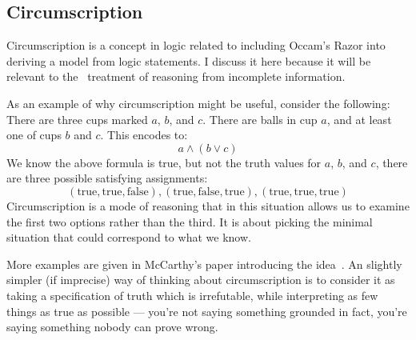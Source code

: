 \subsection{Circumscription}
\label{sec:circumscription}
Circumscription is a concept in logic related to including Occam's Razor into deriving a model from logic statements.
I discuss it here because it will be relevant to the \sysname\ treatment of reasoning from incomplete information.

\newcommand{\true}{\textrm{true}}
\newcommand{\false}{\textrm{false}}
As an example of why circumscription might be useful, consider the following:
There are three cups marked $a$, $b$, and $c$.
There are balls in cup $a$, and at least one of cups $b$ and $c$.
This encodes to:
\[a \wedge (b \vee c)\]
We know the above formula is true, but not the truth values for $a$, $b$, and $c$, there are three possible satisfying assignments:
\[
        (\true, \true, \false), (\true, \false, \true), (\true, \true, \true)
\]
Circumscription is a mode of reasoning that in this situation allows us to examine the first two options rather than the third.
It is about picking the minimal situation that could correspond to what we know.

More examples are given in McCarthy's paper introducing the idea~\cite{circumscription}.
An slightly simpler (if imprecise) way of thinking about circumscription is to consider it as taking a specification of truth which is irrefutable, while interpreting as few things as true as possible --- you're not saying something grounded in fact, you're saying something nobody can prove wrong.
